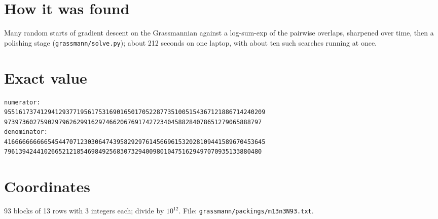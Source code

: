 \documentclass[11pt,a4paper]{article}
\begin{document}
\section{How it was found}
Many random starts of gradient descent on the Grassmannian against a log-sum-exp of the pairwise overlaps, sharpened over time, then a polishing stage (\texttt{grassmann/solve.py}); about 212 seconds on one laptop, with about ten such searches running at once.


\appendix
\section{Exact value}
{\small
\begin{verbatim}
numerator:
955161737412941293771956175316901650170522877351005154367121886714240209
97397360275902979626299162974662067691742723404588284078651279065888797
denominator:
416666666666545447071230306474395829297614566961532028109441589670453645
79613942441026652121854698492568307329400980104751629497070935133880480
\end{verbatim}}

\section{Coordinates}
93 blocks of 13 rows with 3 integers each; divide by $10^{12}$. File: \texttt{grassmann/packings/m13n3N93.txt}.
{\tiny
\begin{multicols}{3}
\end{multicols}}
\end{document}
